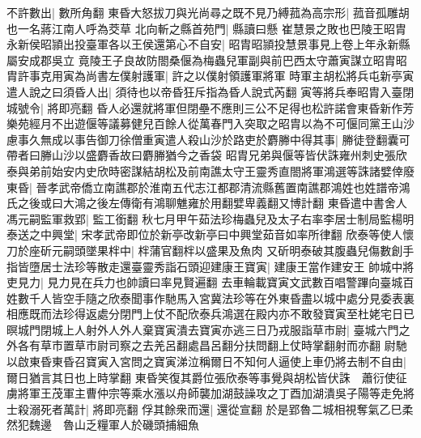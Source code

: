 不許數出|{
	數所角翻}
東昏大怒拔刀與光尚尋之既不見乃縛菰為高宗形|{
	菰音孤雕胡也一名蔣江南人呼為茭草}
北向斬之縣首苑門|{
	縣讀曰懸}
崔慧景之敗也巴陵王昭胄永新侯昭頴出投臺軍各以王侯還第心不自安|{
	昭胄昭頴投慧景事見上卷上年永新縣屬安成郡吳立}
竟陵王子良故防閤桑偃為梅蟲兒軍副與前巴西太守蕭寅謀立昭胄昭胄許事克用寅為尚書左僕射護軍|{
	許之以僕射領護軍將軍}
時軍主胡松將兵屯新亭寅遣人說之曰須昏人出|{
	須待也以帝昏狂斥指為昏人說式芮翻}
寅等將兵奉昭胄入臺閉城號令|{
	將即亮翻}
昏人必還就將軍但閉壘不應則三公不足得也松許諾會東昏新作芳樂苑經月不出遊偃等議募健兒百餘人從萬春門入突取之昭胄以為不可偃同黨王山沙慮事久無成以事告御刀徐僧重寅遣人殺山沙於路吏於麝幐中得其事|{
	幐徒登翻囊可帶者曰幐山沙以盛麝香故曰麝幐猶今之香袋}
昭胄兄弟與偃等皆伏誅雍州刺史張欣泰與弟前始安内史欣時密謀結胡松及前南譙太守王靈秀直閤將軍鴻選等誅諸嬖倖廢東昏|{
	晉孝武帝僑立南譙郡於淮南五代志江都郡清流縣舊置南譙郡鴻姓也姓譜帝鴻氏之後或曰大鴻之後左傳衛有鴻聊魋雍於用翻嬖卑義翻又博計翻}
東昏遣中書舍人馮元嗣監軍救郢|{
	監工銜翻}
秋七月甲午茹法珍梅蟲兒及太子右率李居士制局監楊明泰送之中興堂|{
	宋孝武帝即位於新亭改新亭曰中興堂茹音如率所律翻}
欣泰等使人懷刀於座斫元嗣頭墜果柈中|{
	柈蒲官翻柈以盛果及魚肉}
又斫明泰破其腹蟲兒傷數創手指皆墮居士法珍等散走還臺靈秀詣石頭迎建康王寶寅|{
	建康王當作建安王}
帥城中將吏見力|{
	見力見在兵力也帥讀曰率見賢遍翻}
去車輪載寶寅文武數百唱警蹕向臺城百姓數千人皆空手隨之欣泰聞事作馳馬入宮冀法珍等在外東昏盡以城中處分見委表裏相應既而法珍得返處分閉門上仗不配欣泰兵鴻選在殿内亦不敢發寶寅至杜姥宅日已暝城門閉城上人射外人外人棄寶寅潰去寶寅亦逃三日乃戎服詣草市尉|{
	臺城六門之外各有草市置草市尉司察之去羌呂翻處昌呂翻分扶問翻上仗時掌翻射而亦翻}
尉馳以啟東昏東昏召寶寅入宮問之寶寅涕泣稱爾日不知何人逼使上車仍將去制不自由|{
	爾日猶言其日也上時掌翻}
東昏笑復其爵位張欣泰等事覺與胡松皆伏誅　蕭衍使征虜將軍王茂軍主曹仲宗等乘水漲以舟師襲加湖鼓譟攻之丁酉加湖潰吳子陽等走免將士殺溺死者萬計|{
	將即亮翻}
俘其餘衆而還|{
	還從宣翻}
於是郢魯二城相視奪氣乙巳柔然犯魏邊　魯山乏糧軍人於磯頭捕細魚

